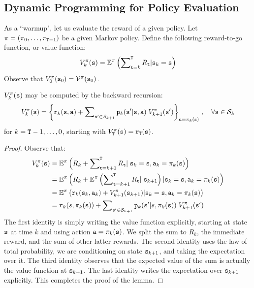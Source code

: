 \subsection{Dynamic Programming for Policy Evaluation}\label{sss:pol_eval}
As a ``warmup", let us evaluate the reward of a given policy. Let
$\pi  = ({\pi _0}, \ldots ,{\pi _{{\tt T} -1}})$ be a
given Markov policy. Define the following reward-to-go function, or
value function:
\[V_k^\pi ({\tt s}) = {\mathbb{E}^\pi }\left( {\sum\nolimits_{{\tt t} = k}^{\tt T} {{R_{\tt t}}|{{\tt s}_k} = {\tt s}} } \right)\]
Observe that $V_0^\pi ({{\tt s}_0}) = {\mathcal{V}^\pi }({{\tt s}_0})$.

\begin{lemma}\label{lem:finite_horizon_VI} $V_k^\pi ({\tt s})$ may be computed by the backward recursion:
\[V_k^\pi ({\tt s}) = {\left\{ {{{\tt r}_k}({\tt s},{\tt a}) + \sum\nolimits_{{\tt s}' \in {\mathcal{S}_{k + 1}}} {{{\tt p}_k}({\tt s}'|{\tt s},{\tt a})} \;V_{k + 1}^\pi ({\tt s}')} \right\}_{a = {\pi _k}({\tt s})}}\;,\quad \forall {\tt s} \in {\mathcal{S}_k}\]
for $k = {\tt T} -1, \ldots ,0$,  starting with
$V_{\tt T}^\pi ({\tt s}) = {{\tt r}_{\tt T}}({\tt s})$.
\end{lemma}
\begin{proof}
Observe that:
\begin{align*}
V_k^\pi ({\tt s}) &= {\mathbb{E}^\pi }\left( {{R_k} + \sum\nolimits_{{\tt t} = k + 1}^{\tt T} {{R_{\tt t}}|} \;{{\tt s}_k} = {\tt s},{{\tt a}_k} = {\pi _k}({\tt s})} \right)\\
 &= {\mathbb{E}^\pi }\left({R_k} + {{\mathbb{E}^\pi }\left( { \sum\nolimits_{{\tt t} = k + 1}^{\tt T} {{R_{\tt t}}} |\;
 {{\tt s}_{k + 1}}} \right)|{{\tt s}_k} = {\tt s},{{\tt a}_k} = {\pi _k}({\tt s})} \right)\\
 &= {\mathbb{E}^\pi }\left( {{\tt r}_k({{\tt s}_k},{{\tt a}_k}) + V_{k + 1}^\pi ({{\tt s}_{k + 1}})|{{\tt s}_k} = {\tt s},{{\tt a}_k} = {\pi _k}({\tt s})} \right)\\
 &= {{\tt r}_k}(s,{\pi _k}({\tt s})) + \sum\nolimits_{{\tt s}' \in {\mathcal{S}_{k + 1}}} {{{\tt p}_k}({\tt s}'|s,{\pi _k}({\tt s}))} \;V_{k + 1}^\pi ({\tt s}')
\end{align*}
The first identity is simply writing the value function explicitly,
starting at state ${\tt s}$ at time $k$ and using action
${\tt a}=\pi_k({\tt s})$.  We split the sum to $R_k$, the immediate
reward, and the sum of other latter rewards.
The second identity uses the law of total probability, we are
conditioning on state ${\tt s}_{k+1}$, and taking the expectation
over it.
%
The third identity observes that the expected value of the sum is actually the value function at ${\tt s}_{k+1}$. The last identity writes the expectation over ${\tt s}_{k+1}$ explicitly. This completes the proof of the lemma.
\end{proof}

